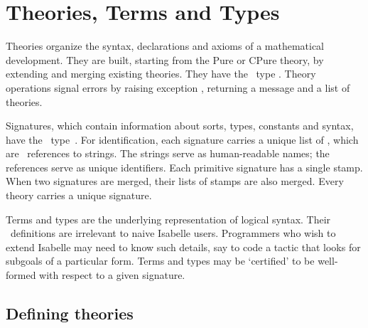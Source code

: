 

\chapter{Theories, Terms and Types} \label{theories}
 Theories organize the syntax,
declarations and axioms of a mathematical development.  They are built,
starting from the Pure or CPure theory, by extending and merging existing
theories.  They have the \ML\ type .  Theory operations signal
errors by raising exception , returning a message and a list of
theories.

Signatures, which contain information about sorts, types, constants and
syntax, have the \ML\ type~.  For identification, each
signature carries a unique list of , which are \ML\
references to strings.  The strings serve as human-readable names; the
references serve as unique identifiers.  Each primitive signature has a
single stamp.  When two signatures are merged, their lists of stamps are
also merged.  Every theory carries a unique signature.

Terms and types are the underlying representation of logical syntax.  Their
\ML\ definitions are irrelevant to naive Isabelle users.  Programmers who
wish to extend Isabelle may need to know such details, say to code a tactic
that looks for subgoals of a particular form.  Terms and types may be
`certified' to be well-formed with respect to a given signature.


\section{Defining theories}\label{sec:ref-defining-theories}

